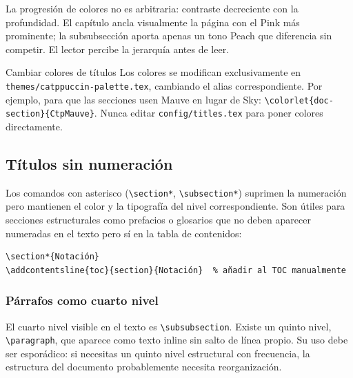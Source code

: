 La progresión de colores no es arbitraria: contraste decreciente con la
profundidad. El capítulo ancla visualmente la página con el Pink más
prominente; la subsubsección aporta apenas un tono Peach que diferencia
sin competir. El lector percibe la jerarquía antes de leer.

\begin{observacion}{Cambiar colores de títulos}
Los colores se modifican exclusivamente en
\texttt{themes/catppuccin-palette.tex}, cambiando el alias correspondiente.
Por ejemplo, para que las secciones usen Mauve en lugar de Sky:
\texttt{\textbackslash colorlet\{doc-section\}\{CtpMauve\}}.
Nunca editar \texttt{config/titles.tex} para poner colores directamente.
\end{observacion}

\subsection{Títulos sin numeración}
\label{subsec:titulos-nonumber}

Los comandos con asterisco (\texttt{\textbackslash section*},
\texttt{\textbackslash subsection*}) suprimen la numeración pero
mantienen el color y la tipografía del nivel correspondiente. Son útiles
para secciones estructurales como prefacios o glosarios que no deben
aparecer numeradas en el texto pero sí en la tabla de contenidos:

\begin{lstlisting}[style=latex, frame=none, numbers=none]
\section*{Notación}
\addcontentsline{toc}{section}{Notación}  % añadir al TOC manualmente
\end{lstlisting}

\subsubsection{Párrafos como cuarto nivel}
\label{subsubsec:parrafos}

El cuarto nivel visible en el texto es \texttt{\textbackslash subsubsection}.
Existe un quinto nivel, \texttt{\textbackslash paragraph}, que aparece como
texto inline sin salto de línea propio. Su uso debe ser esporádico: si
necesitas un quinto nivel estructural con frecuencia, la estructura del
documento probablemente necesita reorganización.

